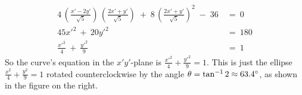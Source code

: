 \begin{exmp}
\begin{align*}
4\,\left(\frac{x' - 2y'}{\sqrt{5}}\right)\,\left(\frac{2x' + y'}{\sqrt{5}}\right) \;+\;
8\,\left(\frac{2x' + y'}{\sqrt{5}}\right)^2 \;-\; 36 ~&=~ 0\\
45x'^2 ~+~ 20y'^2 ~&=~ 180\\
\frac{x'^2}{4} ~+~ \frac{y'^2}{9} ~&=~ 1
\end{align*}
So the curve's equation in the $x'y'$-plane is
$\frac{x'^2}{4}+\frac{y'^2}{9}=1$. This is just the ellipse
$\frac{x^2}{4}+\frac{y^2}{9}=1$ rotated counterclockwise by the angle
$\theta = \tan^{-1}2 \approx 63.4^\circ$, as shown in the figure on the right.
\end{exmp}
\divider
\vspace{2mm}
\startexercises\label{sec7dot4}
